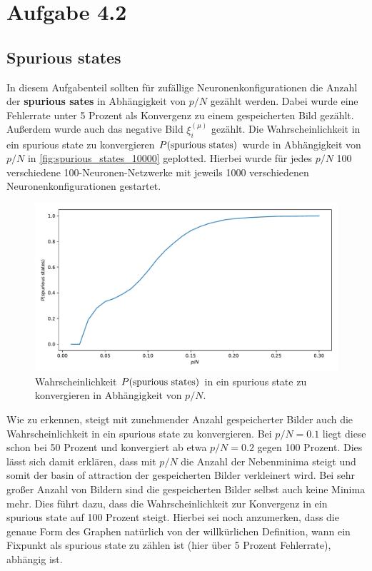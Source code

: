 
\section{Aufgabe 4.2}


\subsection{Spurious states}

In diesem Aufgabenteil sollten für zufällige Neuronenkonfigurationen die Anzahl der \textbf{spurious sates} in Abhängigkeit von $p/N$ gezählt werden. Dabei wurde eine Fehlerrate unter 5 Prozent als Konvergenz zu einem gespeicherten Bild gezählt. Außerdem wurde auch das negative Bild $\xi_i^{(\mu)}$ gezählt. Die Wahrscheinlichkeit in ein spurious state zu konvergieren $P(\textup{spurious states})$ wurde in Abhängigkeit von $p/N$ in \autoref{fig:spurious_states_10000} geplotted. Hierbei wurde für jedes $p/N$ 100 verschiedene 100-Neuronen-Netzwerke mit jeweils 1000 verschiedenen Neuronenkonfigurationen gestartet.

\begin{figure}[htp]
	\centering
	\includegraphics[width = \textwidth]{images/4_2_1/spurious_states_1000_1000.pdf}
	\caption{Wahrscheinlichkeit $P(\textup{spurious states})$ in ein spurious state zu konvergieren in Abhängigkeit von $p/N$.}
	\label{fig:spurious_states_10000}
\end{figure}

Wie zu erkennen, steigt mit zunehmender Anzahl gespeicherter Bilder auch die Wahrscheinlichkeit in ein spurious state zu konvergieren. Bei $p/N = 0.1$ liegt diese schon bei 50 Prozent und konvergiert ab etwa $p/N = 0.2$ gegen 100 Prozent. Dies lässt sich damit erklären, dass mit $p/N$ die Anzahl der Nebenminima steigt und somit der basin of attraction der gespeicherten Bilder verkleinert wird. Bei sehr großer Anzahl von Bildern sind  die gespeicherten Bilder selbst auch keine Minima mehr. Dies führt dazu, dass die Wahrscheinlichkeit zur Konvergenz in ein spurious state auf 100 Prozent steigt. Hierbei sei noch anzumerken, dass die genaue Form des Graphen natürlich von der willkürlichen Definition, wann ein Fixpunkt als spurious state zu zählen ist (hier über 5 Prozent Fehlerrate), abhängig ist.

